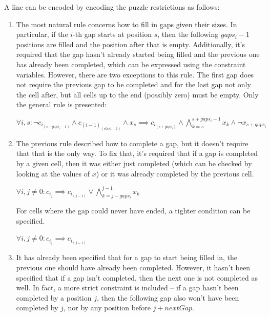 \documentclass[12pt]{article}
\begin{document}
A line can be encoded by encoding the puzzle restrictions as follows:
\begin{enumerate}
  \item The most natural rule concerns how to fill in gaps given their sizes.
        In particular, if the $i$-th gap starts at position $s$, then the following $gaps_i - 1$ positions are filled and the position after that is empty.
        Additionally, it's required that the gap hasn't already started being filled and the previous one has already been completed, which can be expressed using the constraint variables.
        However, there are two exceptions to this rule.
        The first gap does not require the previous gap to be completed and for the last gap not only the cell after, but all cells up to the end (possibly zero) must be empty.
        Only the general rule is presented:
        \begin{center}
          $\forall i, s: \neg c_{i}_{(s+gaps_i-1)} \wedge c_{(i-1)}_{(start-1)} \wedge x_s \implies c_{i}_{(s+gaps_i)} \wedge \bigwedge_{k=s}^{s+gaps_i-1} x_k \wedge \neg x_{s+gaps_i}$
        \end{center}


    \item The previous rule described how to complete a gap, but it doesn't require that that is the only way.
          To fix that, it's required that if a gap is completed by a given cell, then it was either just completed (which can be checked by looking at the values of $x$) or it was already completed by the previous cell.
          \begin{center}
            $\forall i, j \ne 0: c_{i}_{j} \implies c_{i}_{(j-1)} \vee \bigwedge_{k=j-gaps_i}^{j-1} x_k$
          \end{center}

          For cells where the gap could never have ended, a tighter condition can be specified.
          \begin{center}
            $\forall i, j \ne 0: c_{i}_{j} \implies c_{i}_{(j-1)}$
          \end{center}

  \item It has already been specified that for a gap to start being filled in, the previous one should have already been completed. However, it hasn't been specified that if a gap isn't completed, then the next one is not completed as well. In fact, a more strict constraint is included -- if a gap hasn't been completed by a position $j$, then the following gap also won't have been completed by $j$, nor by any position before $j+nextGap$.


\end{enumerate}
\end{document}
